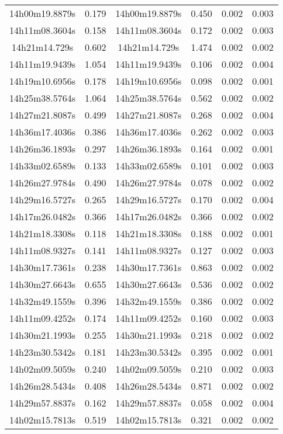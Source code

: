 \begin{table}
\begin{tabular}{cccccc}
14h00m19.8879s & 0.179 & 14h00m19.8879s & 0.450 & 0.002 & 0.003 \\
14h11m08.3604s & 0.158 & 14h11m08.3604s & 0.172 & 0.002 & 0.003 \\
14h21m14.729s & 0.602 & 14h21m14.729s & 1.474 & 0.002 & 0.002 \\
14h11m19.9439s & 1.054 & 14h11m19.9439s & 0.106 & 0.002 & 0.004 \\
14h19m10.6956s & 0.178 & 14h19m10.6956s & 0.098 & 0.002 & 0.001 \\
14h25m38.5764s & 1.064 & 14h25m38.5764s & 0.562 & 0.002 & 0.002 \\
14h27m21.8087s & 0.499 & 14h27m21.8087s & 0.268 & 0.002 & 0.004 \\
14h36m17.4036s & 0.386 & 14h36m17.4036s & 0.262 & 0.002 & 0.003 \\
14h26m36.1893s & 0.297 & 14h26m36.1893s & 0.164 & 0.002 & 0.001 \\
14h33m02.6589s & 0.133 & 14h33m02.6589s & 0.101 & 0.002 & 0.003 \\
14h26m27.9784s & 0.490 & 14h26m27.9784s & 0.078 & 0.002 & 0.002 \\
14h29m16.5727s & 0.265 & 14h29m16.5727s & 0.170 & 0.002 & 0.004 \\
14h17m26.0482s & 0.366 & 14h17m26.0482s & 0.366 & 0.002 & 0.002 \\
14h21m18.3308s & 0.118 & 14h21m18.3308s & 0.188 & 0.002 & 0.001 \\
14h11m08.9327s & 0.141 & 14h11m08.9327s & 0.127 & 0.002 & 0.003 \\
14h30m17.7361s & 0.238 & 14h30m17.7361s & 0.863 & 0.002 & 0.002 \\
14h30m27.6643s & 0.655 & 14h30m27.6643s & 0.536 & 0.002 & 0.002 \\
14h32m49.1559s & 0.396 & 14h32m49.1559s & 0.386 & 0.002 & 0.002 \\
14h11m09.4252s & 0.174 & 14h11m09.4252s & 0.160 & 0.002 & 0.003 \\
14h30m21.1993s & 0.255 & 14h30m21.1993s & 0.218 & 0.002 & 0.002 \\
14h23m30.5342s & 0.181 & 14h23m30.5342s & 0.395 & 0.002 & 0.001 \\
14h02m09.5059s & 0.240 & 14h02m09.5059s & 0.210 & 0.002 & 0.003 \\
14h26m28.5434s & 0.408 & 14h26m28.5434s & 0.871 & 0.002 & 0.002 \\
14h29m57.8837s & 0.162 & 14h29m57.8837s & 0.058 & 0.002 & 0.004 \\
14h02m15.7813s & 0.519 & 14h02m15.7813s & 0.321 & 0.002 & 0.002 \\

\end{tabular}
\end{table}
